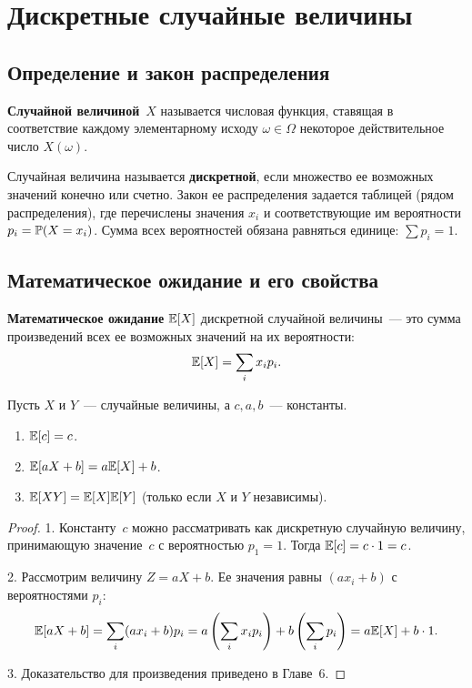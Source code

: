 \section{Дискретные случайные величины}

\subsection{Определение и закон распределения}

\begin{definition}
\textbf{Случайной величиной}~$X$ называется числовая функция, ставящая в соответствие каждому элементарному исходу $\omega \in \Omega$ некоторое действительное число $X(\omega)$.
\end{definition}

Случайная величина называется \textbf{дискретной}, если множество ее возможных значений конечно или счетно. Закон ее распределения задается таблицей (рядом распределения), где перечислены значения $x_i$ и соответствующие им вероятности $p_i = \mathbb{P}(X = x_i)$. Сумма всех вероятностей обязана равняться единице: $\sum p_i = 1$.

\subsection{Математическое ожидание и его свойства}

\begin{definition}
\textbf{Математическое ожидание} $\mathbb{E}[X]$ дискретной случайной величины~--- это сумма произведений всех ее возможных значений на их вероятности:
\[
\mathbb{E}[X] = \sum_{i} x_i p_i.
\]
\end{definition}

\begin{theorem}\label{thm:ev_properties}
Пусть $X$ и $Y$~--- случайные величины, а $c, a, b$~--- константы.
\begin{enumerate}
\item $\mathbb{E}[c] = c$.
\item $\mathbb{E}[aX + b] = a \mathbb{E}[X] + b$.
\item $\mathbb{E}[XY] = \mathbb{E}[X] \mathbb{E}[Y]$ (только если $X$ и $Y$ независимы).
\end{enumerate}
\end{theorem}

\begin{proof}
1. Константу~$c$ можно рассматривать как дискретную случайную величину, принимающую значение~$c$ с вероятностью $p_1 = 1$. Тогда $\mathbb{E}[c] = c \cdot 1 = c$.

2. Рассмотрим величину $Z = aX + b$. Ее значения равны $(a x_i + b)$ с вероятностями $p_i$:
\[
\mathbb{E}[aX + b] = \sum_{i} (a x_i + b) p_i = a \left( \sum_{i} x_i p_i \right) + b \left( \sum_{i} p_i \right) = a \mathbb{E}[X] + b \cdot 1.
\]

3. Доказательство для произведения приведено в Главе~6.
\end{proof}


